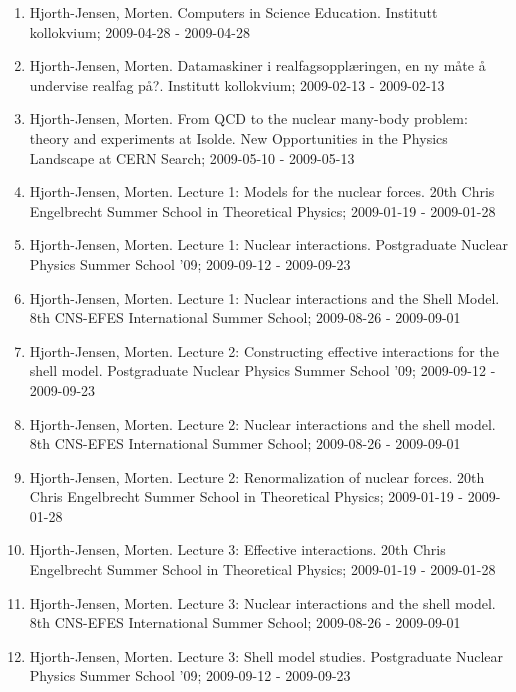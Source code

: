 \documentclass[%
oneside,                 %
final,                   %
10pt]{article}
\begin{document}
\begin{enumerate}
\item Hjorth-Jensen, Morten.  Computers in Science Education. Institutt kollokvium; 2009-04-28 - 2009-04-28

\item Hjorth-Jensen, Morten.  Datamaskiner i realfagsopplæringen, en ny måte å undervise realfag på?. Institutt kollokvium; 2009-02-13 - 2009-02-13

\item Hjorth-Jensen, Morten.  From QCD to the nuclear many-body problem: theory and experiments at Isolde. New Opportunities in the Physics Landscape at CERN Search; 2009-05-10 - 2009-05-13

\item Hjorth-Jensen, Morten.  Lecture 1: Models for the nuclear forces. 20th Chris Engelbrecht Summer School in Theoretical Physics; 2009-01-19 - 2009-01-28

\item Hjorth-Jensen, Morten.  Lecture 1: Nuclear interactions. Postgraduate Nuclear Physics Summer School '09; 2009-09-12 - 2009-09-23

\item Hjorth-Jensen, Morten.  Lecture 1: Nuclear interactions and the Shell Model. 8th CNS-EFES International Summer School; 2009-08-26 - 2009-09-01

\item Hjorth-Jensen, Morten.  Lecture 2: Constructing effective interactions for the shell model. Postgraduate Nuclear Physics Summer School '09; 2009-09-12 - 2009-09-23

\item Hjorth-Jensen, Morten.  Lecture 2: Nuclear interactions and the shell model. 8th CNS-EFES International Summer School; 2009-08-26 - 2009-09-01

\item Hjorth-Jensen, Morten.  Lecture 2: Renormalization of nuclear forces. 20th Chris Engelbrecht Summer School in Theoretical Physics; 2009-01-19 - 2009-01-28

\item Hjorth-Jensen, Morten.  Lecture 3: Effective interactions. 20th Chris Engelbrecht Summer School in Theoretical Physics; 2009-01-19 - 2009-01-28

\item Hjorth-Jensen, Morten.  Lecture 3: Nuclear interactions and the shell model. 8th CNS-EFES International Summer School; 2009-08-26 - 2009-09-01

\item Hjorth-Jensen, Morten.  Lecture 3: Shell model studies. Postgraduate Nuclear Physics Summer School '09; 2009-09-12 - 2009-09-23


\end{enumerate}
\end{document}
